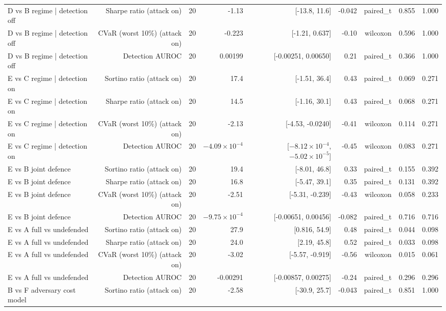 \begin{table}[htbp]
\begin{tabular}{lrrrrrrrr}
    D vs B   regime | detection off & Sharpe ratio (attack on) & 20 & -1.13 & [-13.8, 11.6] & -0.042 & paired\_t & 0.855 & 1.000 \\
    D vs B   regime | detection off & CVaR (worst 10\%) (attack on) & 20 & -0.223 & [-1.21, 0.637] & -0.10 & wilcoxon & 0.596 & 1.000 \\
    D vs B   regime | detection off & Detection AUROC & 20 & 0.00199 & [-0.00251, 0.00650] & 0.21 & paired\_t & 0.366 & 1.000 \\
    E vs C   regime | detection on & Sortino ratio (attack on) & 20 & 17.4 & [-1.51, 36.4] & 0.43 & paired\_t & 0.069 & 0.271 \\
    E vs C   regime | detection on & Sharpe ratio (attack on) & 20 & 14.5 & [-1.16, 30.1] & 0.43 & paired\_t & 0.068 & 0.271 \\
    E vs C   regime | detection on & CVaR (worst 10\%) (attack on) & 20 & -2.13 & [-4.53, -0.0240] & -0.41 & wilcoxon & 0.114 & 0.271 \\
    E vs C   regime | detection on & Detection AUROC & 20 & $-4.09\times10^{-4}$ & [$-8.12\times10^{-4}$, $-5.02\times10^{-5}$] & -0.45 & wilcoxon & 0.083 & 0.271 \\
    E vs B   joint defence & Sortino ratio (attack on) & 20 & 19.4 & [-8.01, 46.8] & 0.33 & paired\_t & 0.155 & 0.392 \\
    E vs B   joint defence & Sharpe ratio (attack on) & 20 & 16.8 & [-5.47, 39.1] & 0.35 & paired\_t & 0.131 & 0.392 \\
    E vs B   joint defence & CVaR (worst 10\%) (attack on) & 20 & -2.51 & [-5.31, -0.239] & -0.43 & wilcoxon & 0.058 & 0.233 \\
    E vs B   joint defence & Detection AUROC & 20 & $-9.75\times10^{-4}$ & [-0.00651, 0.00456] & -0.082 & paired\_t & 0.716 & 0.716 \\
    E vs A   full vs undefended & Sortino ratio (attack on) & 20 & 27.9 & [0.816, 54.9] & 0.48 & paired\_t & 0.044 & 0.098 \\
    E vs A   full vs undefended & Sharpe ratio (attack on) & 20 & 24.0 & [2.19, 45.8] & 0.52 & paired\_t & 0.033 & 0.098 \\
    E vs A   full vs undefended & CVaR (worst 10\%) (attack on) & 20 & -3.02 & [-5.57, -0.919] & -0.56 & wilcoxon & 0.015 & 0.061 \\
    E vs A   full vs undefended & Detection AUROC & 20 & -0.00291 & [-0.00857, 0.00275] & -0.24 & paired\_t & 0.296 & 0.296 \\
    B vs F   adversary cost model & Sortino ratio (attack on) & 20 & -2.58 & [-30.9, 25.7] & -0.043 & paired\_t & 0.851 & 1.000 \\

\end{tabular}
\end{table}
